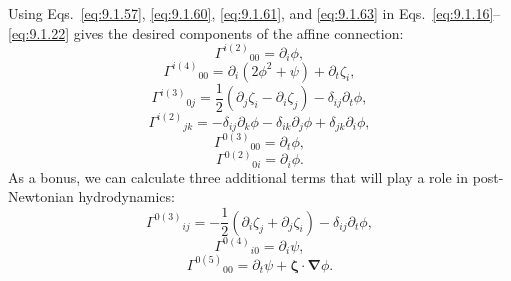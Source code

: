Using Eqs.~\eqref{eq:9.1.57}, \eqref{eq:9.1.60},
\eqref{eq:9.1.61}, and \eqref{eq:9.1.63} in
Eqs.~\eqref{eq:9.1.16}--\eqref{eq:9.1.22} gives the desired components
of the affine connection:
\begin{equation}
  \Gamma^{i(2)}{}_{00}=\partial_i\phi,
  \tag{9.1.67}\label{eq:9.1.67}
\end{equation}
\begin{equation}
  \Gamma^{i(4)}{}_{00}
  =
  \partial_i(2\phi^2+\psi)+\partial_t\zeta_i,
  \tag{9.1.68}\label{eq:9.1.68}
\end{equation}
\begin{equation}
  \Gamma^{i(3)}{}_{0j}
  =
  \frac12(\partial_j\zeta_i-\partial_i\zeta_j)
  -\delta_{ij}\partial_t\phi,
  \tag{9.1.69}\label{eq:9.1.69}
\end{equation}
\begin{equation}
  \Gamma^{i(2)}{}_{jk}
  =
  -\delta_{ij}\partial_k\phi
  -\delta_{ik}\partial_j\phi
  +\delta_{jk}\partial_i\phi,
  \tag{9.1.70}\label{eq:9.1.70}
\end{equation}
\begin{equation}
  \Gamma^{0(3)}{}_{00}=\partial_t\phi,
  \tag{9.1.71}\label{eq:9.1.71}
\end{equation}
\begin{equation}
  \Gamma^{0(2)}{}_{0i}=\partial_i\phi.
  \tag{9.1.72}\label{eq:9.1.72}
\end{equation}
As a bonus, we can calculate three additional terms that will play a role
in post-Newtonian hydrodynamics:
\begin{equation}
  \Gamma^{0(3)}{}_{ij}
  =
  -\frac12(\partial_i\zeta_j+\partial_j\zeta_i)
  -\delta_{ij}\partial_t\phi,
  \tag{9.1.73}\label{eq:9.1.73}
\end{equation}
\begin{equation}
  \Gamma^{0(4)}{}_{i0}=\partial_i\psi,
  \tag{9.1.74}\label{eq:9.1.74}
\end{equation}
\begin{equation}
  \Gamma^{0(5)}{}_{00}
  =
  \partial_t\psi+\boldsymbol\zeta\cdot\boldsymbol\nabla\phi.
  \tag{9.1.75}\label{eq:9.1.75}
\end{equation}
